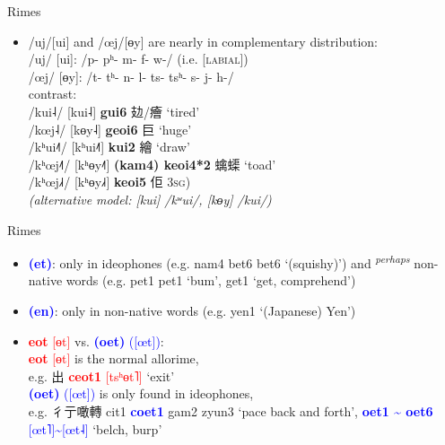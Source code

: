\documentclass{beamer}
\begin{document}
\begin{frame}[fragile]{Rimes}

\begin{itemize}
    \item /uj/[ui] and /œj/[ɵy] are nearly in complementary distribution:\\
    /uj/ [ui]: /p- pʰ- m- f- w-/ \quad (i.e. [\textsc{labial}])\\
    /œj/ [ɵy]: /t- tʰ- n- l- ts- tsʰ- s- j- h-/\\
    \medskip
    contrast:\\ 
    /kui˨/ [kui˨] \textbf{gui6} 攰/癐 \enquote*{tired}\\
    /kœj˨/ [kɵy˨] \textbf{geoi6} 巨 \enquote*{huge}\\
    \medskip
    /kʰui˨˥/ [kʰui˨˥] \textbf{kui2} 繪 \enquote*{draw}\\
    /kʰœj˨˥/ [kʰɵy˨˥] \textbf{(kam4) keoi4*2} 蠄蟝 \enquote*{toad}\\
    /kʰœj˩˧/ [kʰɵy˩˧] \textbf{keoi5} 佢 \textsc{3sg})\\
    \medskip
    \emph{(alternative model: [kui] /kʷui/, [kɵy] /kui/)} 
\end{itemize}

\end{frame}

\begin{frame}[fragile]{Rimes}

\begin{itemize}
     \item \textcolor{blue}{\textbf{(et)}}: only in ideophones (e.g. nam4 bet6 bet6 \enquote*{(squishy)}) and \textsuperscript{\emph{perhaps}} non-native words (e.g. pet1 pet1 \enquote*{bum}, get1 \enquote*{get, comprehend})
    \item \textcolor{blue}{\textbf{(en)}}: only in non-native words (e.g. yen1 \enquote*{(Japanese) Yen})
    \item \textcolor{red}{\textbf{eot} [ɵt]} vs. \textcolor{blue}{\textbf{(oet)} ([œt])}:\\
    \textcolor{red}{\textbf{eot} [ɵt]} is the normal allorime,\\ \quad e.g. 出 \textcolor{red}{\textbf{ceot1} [tsʰɵt˥]} \enquote*{exit}\\
    \textcolor{blue}{\textbf{(oet)} ([œt])} is only found in ideophones,\\ \quad e.g. 彳亍噉轉 cit1 \textcolor{blue}{\textbf{coet1}} gam2 zyun3 \enquote*{pace back and forth}, \textcolor{blue}{\textbf{oet1 \~{} oet6} [œt˥]\~{}[œt˨]} \enquote*{belch, burp}
\end{itemize}

\end{frame}
\end{document}
